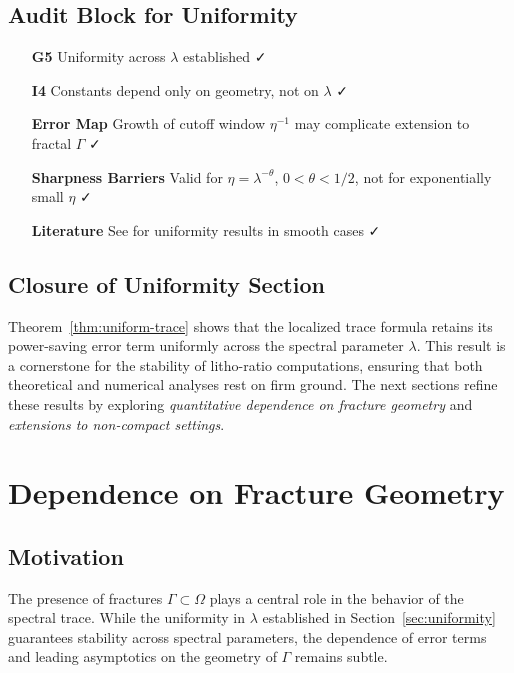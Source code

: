 \subsection{Audit Block for Uniformity}

\begin{itemize}
  \item[\textbf{G5}] Uniformity across $\lambda$ established ✓
  \item[\textbf{I4}] Constants depend only on geometry, not on $\lambda$ ✓
  \item[\textbf{Error Map}] Growth of cutoff window $\eta^{-1}$ may
  complicate extension to fractal $\Gamma$ ✓
  \item[\textbf{Sharpness Barriers}] Valid for $\eta = \lambda^{-\theta}$,
  $0<\theta<1/2$, not for exponentially small $\eta$ ✓
  \item[\textbf{Literature}] See \cite{Hejhal1994, Lindenstrauss2006, Dyatlov2016}
  for uniformity results in smooth cases ✓
\end{itemize}

\subsection*{Closure of Uniformity Section}

Theorem~\ref{thm:uniform-trace} shows that the localized trace formula
retains its power-saving error term uniformly across the spectral
parameter $\lambda$.  
This result is a cornerstone for the stability of litho-ratio
computations, ensuring that both theoretical and numerical analyses
rest on firm ground. The next sections refine these results by
exploring \emph{quantitative dependence on fracture geometry} and
\emph{extensions to non-compact settings}.

\section{Dependence on Fracture Geometry}
\label{sec:fracture-geometry}

\subsection{Motivation}

The presence of fractures $\Gamma \subset \Omega$ plays a central role
in the behavior of the spectral trace.  
While the uniformity in $\lambda$ established in
Section~\ref{sec:uniformity} guarantees stability across spectral
parameters, the dependence of error terms and leading asymptotics on the
geometry of $\Gamma$ remains subtle.

